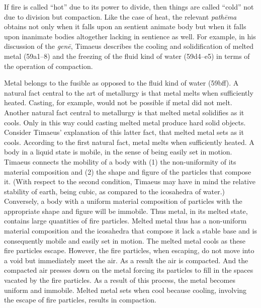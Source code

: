 If fire is called ``hot'' due to its power to divide, then things are called ``cold'' not due to division but compaction. Like the case of heat, the relevant \emph{pathēma} obtains not only when it falls upon an sentient animate body but when it falls upon inanimate bodies altogether lacking in sentience as well. For example, in his discussion of the \emph{genē}, Timaeus describes the cooling and solidification of melted metal (59a1--8) and the freezing of the fluid kind of water (59d4--e5) in terms of the operation of compaction. 

Metal belongs to the fusible as opposed to the fluid kind of water (59bff). A natural fact central to the art of metallurgy is that metal melts when sufficiently heated. Casting, for example, would not be possible if metal did not melt. Another natural fact central to metallurgy is that melted metal solidifies as it cools. Only in this way could casting melted metal produce hard solid objects. Consider Timaeus' explanation of this latter fact, that melted metal sets as it cools. According to the first natural fact, metal melts when sufficiently heated. A body in a liquid state is mobile, in the sense of being easily set in motion. Timaeus connects the mobility of a body with (1) the non-uniformity of its material composition and (2) the shape and figure of the particles that compose it. (With respect to the second condition, Timaeus may have in mind the relative stability of earth, being cubic, as compared to the icosahedra of water.) Conversely, a body with a uniform material composition of particles with the appropriate shape and figure will be immobile. Thus metal, in its melted state, contains large quantities of fire particles. Melted metal thus has a non-uniform material composition and the icosahedra that compose it lack a stable base and is consequently mobile and easily set in motion. The melted metal cools as these fire particles escape. However, the fire particles, when escaping, do not move into a void but immediately meet the air. As a result the air is compacted. And the compacted air presses down on the metal forcing its particles to fill in the spaces vacated by the fire particles. As a result of this process, the metal becomes uniform and immobile. Melted metal sets when cool because cooling, involving the escape of fire particles, results in compaction.


